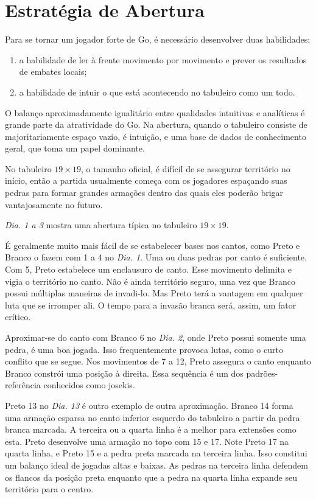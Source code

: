 \chapter{Estratégia de Abertura}\label{chap:6:estrat_abertura}

Para se tornar um jogador forte de Go, é necessário desenvolver duas habilidades:

\begin{enumerate}
    \item a habilidade de ler à frente movimento por movimento e prever os resultados de embates locais;
    \item a habilidade de intuir o que está acontecendo no tabuleiro como um todo.
\end{enumerate}

O balanço aproximadamente igualitário entre qualidades intuitivas e analíticas é grande parte da atratividade do Go. Na abertura, quando o tabuleiro consiste de majoritariamente espaço vazio, é intuição, e uma base de dados de conhecimento geral, que toma um papel dominante.

No tabuleiro $19\times19$, o tamanho oficial, é difícil de se assegurar território no início, então a partida usualmente começa com os jogadores espaçando suas pedras para formar grandes armações dentro das quais eles poderão brigar vantajosamente no futuro.

\emph{Dia. 1 a 3} mostra uma abertura típica no tabuleiro $19\times19$.

É geralmente muito mais fácil de se estabelecer bases nos cantos, como Preto e Branco o fazem com 1 a 4 no \emph{Dia. 1}. Uma ou duas pedras por canto é suficiente. Com 5, Preto estabelece um enclausuro de canto. Esse movimento delimita e vigia o território no canto. Não é ainda território seguro, uma vez que Branco possui múltiplas maneiras de invadi-lo. Mas Preto terá a vantagem em qualquer luta que se irromper ali. O tempo para a invasão branca será, assim, um fator crítico.

Aproximar-se do canto com Branco 6 no \emph{Dia. 2}, onde Preto possui somente uma pedra, é uma boa jogada. Isso frequentemente provoca lutas, como o curto conflito que se segue. Nos movimentos de 7 a 12, Preto assegura  o canto enquanto Branco constrói uma posição à direita. Essa sequência é um dos padrões-referência conhecidos como josekis.

Preto 13 no \emph{Dia. 13} é outro exemplo de outra aproximação. Branco 14 forma uma armação esparsa no canto inferior esquerdo do tabuleiro a partir da pedra branca marcada. A terceira ou a quarta linha é a melhor para extensões como esta. Preto desenvolve uma armação no topo com 15 e 17. Note Preto 17 na quarta linha, e Preto 15 e a pedra preta marcada na terceira linha. Isso constitui um balanço ideal de jogadas altas e baixas. As pedras na terceira linha defendem os flancos da posição preta enquanto que a pedra na quarta linha expande seu território para o centro.

